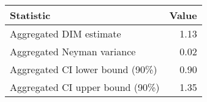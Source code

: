 \begin{tabular}{lr}
  \hline
Statistic & Value \\ 
  \hline
Aggregated DIM estimate & 1.13 \\ 
  Aggregated Neyman variance & 0.02 \\ 
  Aggregated CI lower bound (90\%) & 0.90 \\ 
  Aggregated CI upper bound (90\%) & 1.35 \\ 
   \hline
\end{tabular}
